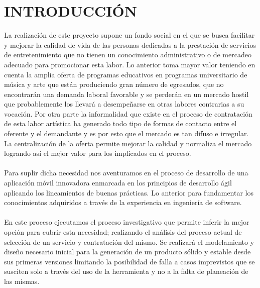\setcounter{page}{1}
\chapter*{INTRODUCCIÓN}
La realización de este proyecto supone un fondo social en el que se busca facilitar y mejorar la calidad de vida de las personas dedicadas a la prestación de servicios de entretenimiento que no tienen un conocimiento administrativo o de mercadeo adecuado para promocionar esta labor. Lo anterior toma mayor valor teniendo en cuenta la amplia oferta de programas educativos en programas universitario de música y arte que están produciendo gran número de egresados, que no encontrarán una demanda laboral favorable y se perderán en un mercado hostil que probablemente los llevará a desempeñarse en otras labores contrarias a su vocación. Por otra parte la informalidad que existe en el proceso de contratación de esta labor artística ha generado todo tipo de formas de contacto entre el oferente y el demandante y es por esto que el mercado es tan difuso e irregular. La centralización de la oferta permite mejorar la calidad y normaliza el mercado logrando así el mejor valor para los implicados en el proceso.\\ \\
 Para suplir dicha necesidad nos aventuramos en el proceso de desarrollo de una aplicación móvil innovadora enmarcada en los principios de desarrollo ágil aplicando los lineamientos de buenas prácticas. Lo anterior para fundamentar los conocimientos adquiridos a través de la experiencia en ingeniería de software.\\ \\
En este proceso ejecutamos el proceso investigativo que permite inferir la mejor opción para cubrir esta necesidad; realizando el análisis del proceso actual de selección de un servicio y contratación del mismo. Se realizará el modelamiento y diseño necesario inicial para la generación de un producto sólido y estable desde sus primeras versiones limitando la posibilidad de falla a casos imprevistos que se susciten solo a través del uso de la herramienta y no a la falta de planeación de las mismas.
